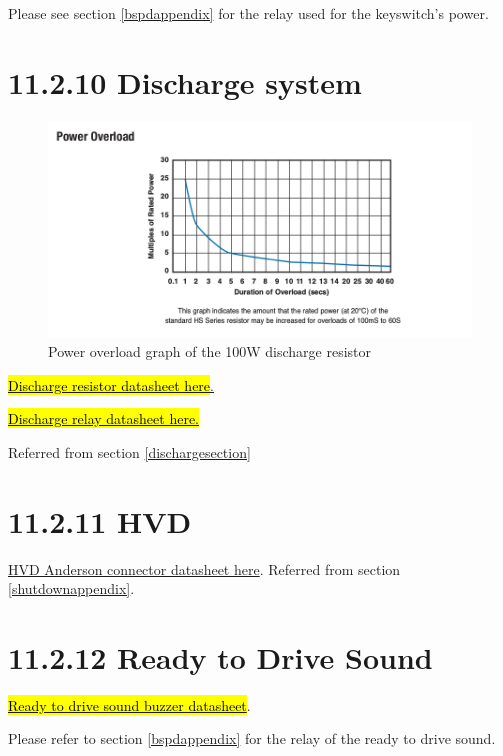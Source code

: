 \documentclass{article}
\DeclareRobustCommand{\hlr}[1]{{\sethlcolor{red}\hl{#1}}}
\begin{document}
Please see section \ref{bspdappendix} for the relay used for the keyswitch's power. 

\section*{11.2.10 Discharge system} \label{dischargeappendix}

\begin{figure}[H]
    \centering
    \includegraphics[width = 0.8 \textwidth]{Dischargeres}
    \caption{Power overload graph of the 100W discharge resistor}
    \label{disres}
\end{figure}

\href{http://www.farnell.com/datasheets/1498243.pdf}{\hlr{Discharge resistor datasheet here}.}

\href{http://cotorelay.com/product/5500-series-high-voltage-reed-relays/}{\hlr{Discharge relay datasheet here.}} 

Referred from section \ref{dischargesection}

\section*{11.2.11 HVD } \label{hvdappendix}

\href{http://www.andersonpower.com/_global-assets/downloads/pdf/ds-smart.pdf}{HVD Anderson connector datasheet here}. Referred from section \ref{shutdownappendix}.

\section*{11.2.12 Ready to Drive Sound} \label{r2dappendix}

\href{http://www.mouser.com/ds/2/252/SC648ANR-63353.pdf}{\hlr{Ready to drive sound buzzer datasheet}}.

Please refer to section \ref{bspdappendix} for the relay of the ready to drive sound.
\end{document}
